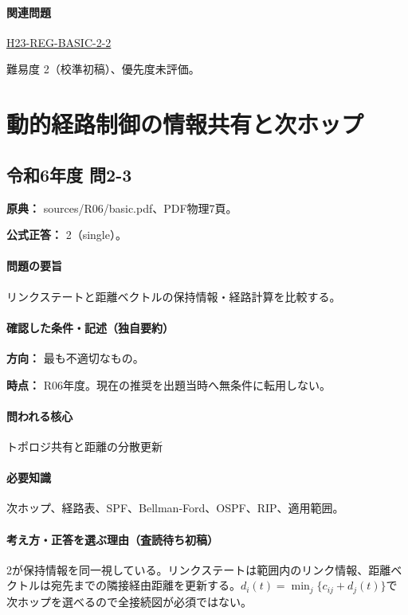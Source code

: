 \paragraph{関連問題} \hyperref[q:h23-reg-basic-2-2]{H23-REG-BASIC-2-2}

\par 難易度 2（校準初稿）、優先度未評価。

\section{動的経路制御の情報共有と次ホップ}

\subsection{令和6年度 問2-3}
\label{q:r06-reg-basic-2-3}

\noindent\textbf{原典：} sources/R06/basic.pdf、PDF物理7頁。

\textbf{公式正答：} 2（single）。

\paragraph{問題の要旨} リンクステートと距離ベクトルの保持情報・経路計算を比較する。

\paragraph{確認した条件・記述（独自要約）}\mbox{}\par

\noindent\textbf{方向：} 最も不適切なもの。\par

\noindent\textbf{時点：} R06年度。現在の推奨を出題当時へ無条件に転用しない。\par

\paragraph{問われる核心} トポロジ共有と距離の分散更新

\paragraph{必要知識} 次ホップ、経路表、SPF、Bellman-Ford、OSPF、RIP、適用範囲。

\paragraph{考え方・正答を選ぶ理由（査読待ち初稿）} 2が保持情報を同一視している。リンクステートは範囲内のリンク情報、距離ベクトルは宛先までの隣接経由距離を更新する。\(d_i(t)=\min_j\{c_{ij}+d_j(t)\}\)で次ホップを選べるので全接続図が必須ではない。

